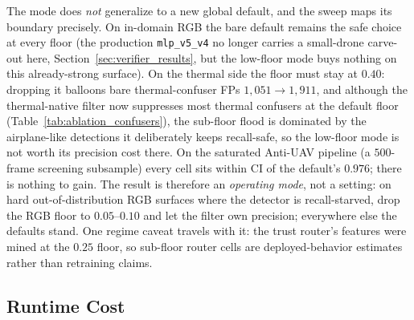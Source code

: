 The mode does \emph{not} generalize to a new global default, and the sweep maps its boundary precisely. On in-domain RGB the bare default remains the safe choice at every floor (the production \texttt{mlp\_v5\_v4} no longer carries a small-drone carve-out here, Section~\ref{sec:verifier_results}, but the low-floor mode buys nothing on this already-strong surface). On the thermal side the floor must stay at $0.40$: dropping it balloons bare thermal-confuser FPs $1{,}051 \to 1{,}911$, and although the thermal-native filter now suppresses most thermal confusers at the default floor (Table~\ref{tab:ablation_confusers}), the sub-floor flood is dominated by the airplane-like detections it deliberately keeps recall-safe, so the low-floor mode is not worth its precision cost there. On the saturated Anti-UAV pipeline (a $500$-frame screening subsample) every cell sits within CI of the default's $0.976$; there is nothing to gain. The result is therefore an \emph{operating mode}, not a setting: on hard out-of-distribution RGB surfaces where the detector is recall-starved, drop the RGB floor to $0.05$--$0.10$ and let the filter own precision; everywhere else the defaults stand. One regime caveat travels with it: the trust router's features were mined at the $0.25$ floor, so sub-floor router cells are deployed-behavior estimates rather than retraining claims.

\subsection{Runtime Cost}
\label{sec:pipeline_speed}

\begin{table}[htbp]
    \centering
    \caption{Per-stage runtime (GTX 1050 Ti). The production stages are cheap enough to run on every frame; the predecessors they replaced were the reason gating architectures existed at all.}
    \label{tab:speed}
\end{table}

